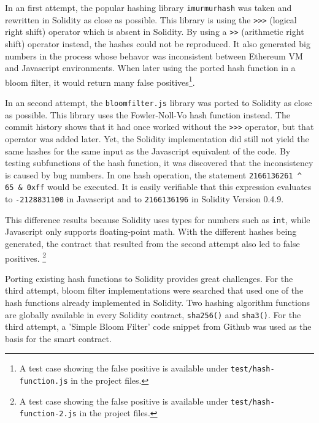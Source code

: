 In an first attempt, the popular hashing library \texttt{imurmurhash} \cite{imurmur} was taken and rewritten in Solidity as close as possible. This library is using the \texttt{\textgreater{}\textgreater{}\textgreater} (logical right shift) operator which is absent in Solidity. By using a \texttt{\textgreater{}\textgreater} (arithmetic right shift) operator instead, the hashes could not be reproduced. It also generated big numbers in the process whose behavor was inconsistent between Ethereum VM and Javascript environments.
When later using the ported hash function in a bloom filter, it would return many false positives\footnote{A test case showing the false positive is available under \texttt{test/hash-function.js} in the project files.}.

In an second attempt, the \texttt{bloomfilter.js} \cite{bloomfilterjs} library was ported to Solidity as close as possible. This library uses the Fowler-Noll-Vo hash function instead. The commit history shows that it had once worked without the \texttt{\textgreater{}\textgreater{}\textgreater} operator, but that operator was added later. Yet, the Solidity implementation did still not yield the same hashes for the same input as the Javascript equivalent of the code. By testing subfunctions of the hash function, it was discovered that the inconsistency is caused by bug numbers. In one hash operation, the statement \texttt{2166136261 \textasciicircum{} 65 \& 0xff} would be executed. It is easily verifiable that this expression evaluates to \texttt{-2128831100} in Javascript and to \texttt{2166136196} in Solidity Version 0.4.9.

This difference results because Solidity uses types for numbers such as \texttt{int}, while Javascript only supports floating-point math. With the different hashes being generated, the contract that resulted from the second attempt also led to false positives. \footnote{A test case showing the false positive is available under \texttt{test/hash-function-2.js} in the project files.}

Porting existing hash functions to Solidity provides great challenges. For the third attempt, bloom filter implementations were searched that used one of the hash functions already implemented in Solidity. Two hashing algorithm functions are globally available in every Solidity contract, \texttt{sha256()} and \texttt{sha3()}. For the third attempt, a 'Simple Bloom Filter' \cite{SimpleBloomFilter} code snippet from Github was used as the basis for the smart contract.

